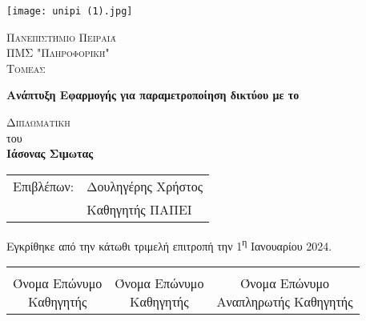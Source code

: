            \begin{center}
	
	       \vspace*{-1cm}

    \texttt{[image: unipi (1).jpg]}
        
    \Large
    \textsc{Πανεπιστήμιο Πειραιά}\\
    \large
    \textsc{ΠΜΣ "Πληροφορική" }\\
    \textsc{Τομεας}
    
    \vspace{1.5cm}
	
	\Huge
    \textbf{Ανάπτυξη Εφαρμογής για παραμετροποίηση δικτύου με το }
        
    \vspace{1.5cm}
    \Large
    \textsc{Διπλωματικη }\\
    του\\

    \LARGE
    \textbf{Ιάσονας Σιμωτας}
    
    \vfill
    \end{center}
    
   

    \begin{tabular}{ll}
		Επιβλέπων: & Δουληγέρης Χρήστος \\
		 & Καθηγητής ΠΑΠΕΙ
	\end{tabular}
	
	\vspace{1.5cm}
    
    Εγκρίθηκε από την κάτωθι τριμελή επιτροπή την 1\textsuperscript{η} Ιανουαρίου 2024.
    
    \vspace{1.5cm}
	
	\begin{center}
	\noindent\begin{tabular}{ccc}
		\makebox[0.3\textwidth]{\hrulefill} & 
		\makebox[0.3\textwidth]{\hrulefill} & 
		\makebox[0.3\textwidth]{\hrulefill} \\

		\specialcell{Όνομα Επώνυμο \\ Καθηγητής} & 
		\specialcell{Όνομα Επώνυμο \\ Καθηγητής} & 
		\specialcell{Όνομα Επώνυμο \\ Αναπληρωτής Καθηγητής} \\ [8ex]%
	\end{tabular}
	\end{center}